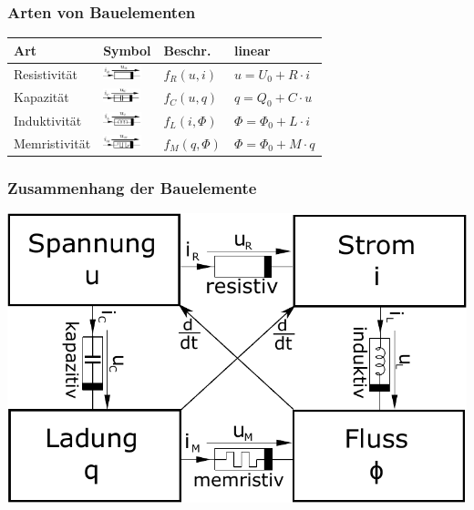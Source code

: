 \documentclass[fs, footer]{latex4ei}
\begin{document}
\begin{multicols*}{4}
		\subsubsection{Arten von Bauelementen}
		\begin{tabular}{l|l|l|l}
			Art & Symbol & Beschr. & linear\\ \hline
			Resistivität & \includegraphics[height=0.4cm]{./img/Resistivitat.pdf} & $f_R(u,i)$  & $u = U_0 + R \cdot i$\\
			Kapazität & \includegraphics[height=0.4cm]{./img/Kapazivitat.pdf} & $f_C(u,q)$ & $q = Q_0 + C \cdot u$\\
			Induktivität & \includegraphics[height=0.4cm]{./img/Induktivitat.pdf} & $f_L(i,\Phi)$ & $\Phi = \Phi_0 + L \cdot i$\\
			Memristivität & \includegraphics[height=0.4cm]{./img/Memristivitat.pdf} & $f_M(q,\Phi)$ & $\Phi = \Phi_0 + M \cdot q$\\
		\end{tabular}
		\subsubsection{Zusammenhang der Bauelemente}
		\begin{center}
			\includegraphics[scale=0.3]{./img/reactance_overview.pdf}
		\end{center}

\end{multicols*}
\end{document}
